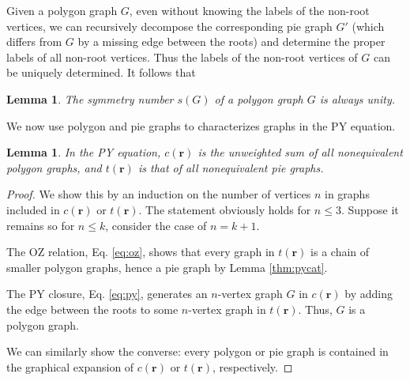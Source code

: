 \documentclass[preprint]{revtex4-1}
\newtheorem{lemm}[thrm]{Lemma}
\newcommand{\vct}[1]{\mathbf{#1}}
\providecommand{\vr}{} %
\renewcommand{\vr}{\vct{r}}
\begin{document}
Given a polygon graph $G$,
even without knowing the labels of the non-root vertices,
we can recursively decompose the corresponding pie graph $G'$
(which differs from $G$ by a missing edge between the roots)
and determine the proper labels of all non-root vertices.
%
Thus
the labels of the non-root vertices of $G$
can be uniquely determined.
%
It follows that

\begin{lemm}
The symmetry number $s(G)$ of a polygon graph $G$ is always unity.
\label{thm:polygonsymnum}
\end{lemm}



We now use polygon and pie graphs to characterizes
  graphs in the PY equation.

\begin{lemm}
In the PY equation,
  $c(\vr)$ is the unweighted sum of
  all nonequivalent polygon graphs,
  and $t(\vr)$ is that of all nonequivalent
  pie graphs\cite{rice1965}.
\label{thm:pycrsum}
\end{lemm}

\begin{proof}
We show this by an induction on the number of vertices $n$ in
  graphs included in $c(\vr)$ or $t(\vr)$.
%
The statement obviously holds for $n \le 3$.
%
Suppose it remains so for $n \le k$,
consider the case of $n = k + 1$.

The OZ relation, Eq. \eqref{eq:oz},
  shows that every graph in $t(\vr)$
  is a chain of smaller polygon graphs,
  hence a pie graph by Lemma \ref{thm:pycat}.

The PY closure, Eq. \eqref{eq:py}, generates
  an $n$-vertex graph $G$ in $c(\vr)$
  by adding the edge between the roots
  to some $n$-vertex graph in $t(\vr)$.
%
Thus, $G$ is a polygon graph.

We can similarly show the converse:
  every polygon or pie graph
  is contained in the graphical expansion
  of $c(\vr)$ or $t(\vr)$,
  respectively.
\end{proof}


\end{document}
